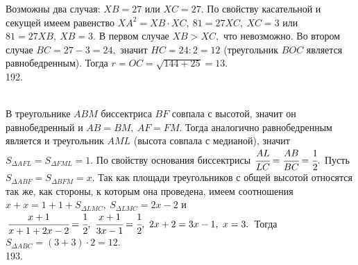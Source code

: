 \documentclass[12pt]{article}
\begin{document}
Возможны два случая: $XB=27$ или $XC=27.$ По свойству касательной и секущей имеем равенство $XA^2=XB\cdot XC,\ 81=27XC,\ XC=3$ или $81=27XB,\ XB=3.$ В первом случае $XB>XC,$ что невозможно. Во втором случае $BC=27-3=24,$ значит $HC=24:2=12$ (треугольник $BOC$ является равнобедренным). Тогда $r=OC=\sqrt{144+25}=13.$\\
192. \begin{figure}[ht!]
\end{figure}\\
В треугольнике $ABM$ биссектриса $BF$ совпала с высотой, значит он равнобедренный и $AB=BM,\ AF=FM.$ Тогда аналогично равнобедренным является и треугольник $AML$ (высота совпала с медианой), значит $S_{\Delta AFL}=S_{\Delta FML}=1.$ По свойству основания биссектрисы $\cfrac{AL}{LC}=\cfrac{AB}{BC}=\cfrac{1}{2}.$ Пусть $S_{\Delta ABF}=S_{\Delta BFM}=x.$ Так как площади треугольников с общей высотой относятся так же, как стороны, к которым она проведена, имеем соотношения
$x+x=1+1+S_{\Delta LMC},\ S_{\Delta LMC}=2x-2$ и $\cfrac{x+1}{x+1+2x-2}=\cfrac{1}{2},\ \cfrac{x+1}{3x-1}=\cfrac{1}{2},\ 2x+2=3x-1,\ x=3.$ Тогда $S_{\Delta ABC}=(3+3)\cdot2=12.$\\
193. \begin{figure}[ht!]
\end{figure}\\
\end{document}
